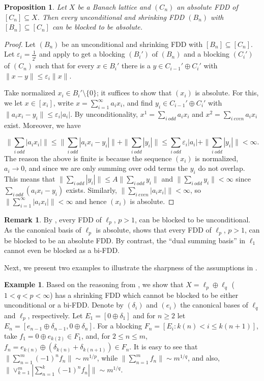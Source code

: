 \documentclass[12pt,leqno]{amsart}
\newtheorem{proposition}[theorem]{Proposition}
\numberwithin{equation}{section}
\theoremstyle{definition}
\newtheorem{remark}[theorem]{Remark}
\newtheorem{example}[theorem]{Example}
\begin{document}
\begin{proposition}\label{Blocking to get a-FDD}
Let $X$ be a Banach lattice and $(C_n)$ an absolute FDD of $[C_n]\subseteq X$. Then every unconditional and shrinking FDD $(B_n)$ with $[B_n]\subseteq [C_n]$ can be blocked to be absolute.
\end{proposition}
\begin{proof}
Let $(B_n)$ be an unconditional and shrinking FDD with $[B_n]\subseteq [C_n]$.  Let $\varepsilon_i=\frac{1}{2^i}$ and apply \cite[Proposition 1.g.4]{LT1} to get a blocking $(B_i')$ of $(B_n)$ and a blocking $(C_i')$ of $(C_n)$ such that for every $x\in B_i'$ there is a $y\in C_{i-1}'\oplus C_i'$ with $\|x-y\|\leq \varepsilon_i\|x\|$.
\medskip

Take normalized $x_i\in B_i'\setminus \{0\}$; it suffices to show that $(x_i)$ is absolute. For this, we let $x\in [x_i]$, write $x=\sum_{i=1}^\infty a_ix_i$, and find $y_i\in C_{i-1}'\oplus C_i'$ with $\|a_ix_i-y_i\|\leq \varepsilon_i |a_i|$. By unconditionality,
$x^1=\sum_{i\ odd}a_ix_i$ and $x^2=\sum_{i\ even} a_ix_i$ exist.  Moreover, we have 

$$\|\sum_{i\ odd}|a_ix_i|\|\leq\|\sum_{i \ odd}|a_ix_i-y_i|\|+\|\sum_{i\ odd}|y_i|\|\leq \sum_{i \ odd}\varepsilon_i |a_i|+\|\sum_{i\ odd}|y_i|\|<\infty.$$ 
The reason the above is finite is because the sequence $(x_i)$ is normalized, $a_i\to 0$, and since we are only summing over odd terms the $y_i$ do not overlap. This means that $\|\sum_{i\ odd}|y_i|\|\leq A\|\sum_{i\ odd}y_i\|$ and $\|\sum_{i\ odd}y_i\|<\infty$ since $\sum_{i\ odd}(a_ix_i-y_i)$ exists. Similarly, $\|\sum_{i\ even} |a_ix_i|\|<\infty$, so $\|\sum_{i=1}^\infty |a_ix_i|\|<\infty$ and hence $(x_i)$ is absolute.
\end{proof}
\begin{remark}
By \cite{Johnson-Zippin72}, every FDD of $\ell_p$, $p>1$, can be blocked to be unconditional.
As the canonical basis of $\ell_p$ is absolute,  shows that every FDD of $\ell_p$, $p>1$, can be blocked to be an absolute FDD. By contrast, the ``dual summing basis'' in $\ell_1$ cannot even be blocked as a bi-FDD. 
\end{remark}
Next, we present two examples to illustrate the sharpness of the assumptions in .
\begin{example}
Based on the reasoning from \cite[Example 2.13]{JO81}, we show that $X=\ell_p\oplus \ell_q$ ($1 < q < p < \infty$) has a shrinking FDD which cannot be blocked to be either unconditional or a bi-FDD.
Denote by $(\delta_i)$ and $(e_i)$ the canonical bases of $\ell_q$ and  $\ell_p$, respectively. Let $E_1=[0\oplus \delta_1]$ and for $n\geq 2$ let $E_n=[e_{n-1}\oplus \delta_{n-1},0\oplus \delta_n]$.
For a blocking $F_n = [E_i : k(n) < i \leq k(n+1)]$, take $f_1 = 0 \oplus e_{k(2)} \in F_1$, and, for $2 \leq n \leq m$, $f_n = e_{k(n)} \oplus (\delta_{k(n)} + \delta_{k(n+1)}) \in F_n$.
It is easy to see that $\|\sum_{n=1}^m (-1)^n f_n\| \sim m^{1/p}$, while  $\|\sum_{n=1}^m f_n\| \sim m^{1/q}$, and also, $\|\vee_{k=1}^m |\sum_{n=1}^k (-1)^n f_n| \| \sim m^{1/q}$.
\end{example}
\end{document}
